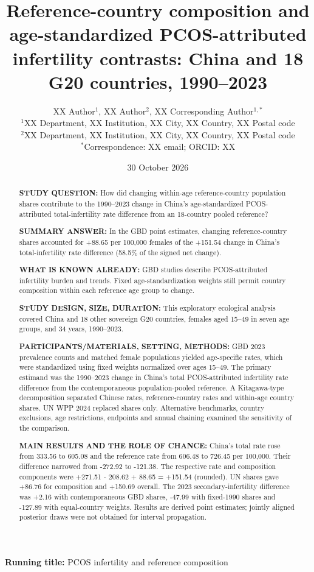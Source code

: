 \documentclass[11pt,a4paper]{article}
\title{Reference-country composition and age-standardized PCOS-attributed infertility contrasts: China and 18 G20 countries, 1990--2023}
\author{XX Author$^{1}$, XX Author$^{2}$, XX Corresponding Author$^{1,*}$\\
{\small $^{1}$XX Department, XX Institution, XX City, XX Country, XX Postal code}\\
{\small $^{2}$XX Department, XX Institution, XX City, XX Country, XX Postal code}\\
{\small $^{*}$Correspondence: XX email; ORCID: XX}}
\date{30 October 2026}
\begin{document}
\maketitle\thispagestyle{fancy}
\noindent\textbf{Running title:} PCOS infertility and reference composition

\linenumbers
\begingroup\sloppy
\begin{abstract}
\noindent\textbf{STUDY QUESTION:} {\color{blue} How did changing within-age reference-country population shares contribute to the 1990--2023 change in China's age-standardized PCOS-attributed total-infertility rate difference from an 18-country pooled reference?}

\noindent\textbf{SUMMARY ANSWER:} In the GBD point estimates, changing reference-country shares accounted for +88.65 per 100,000 females of the +151.54 change in China's total-infertility rate difference (58.5\% of the signed net change).

\noindent\textbf{WHAT IS KNOWN ALREADY:} GBD studies describe PCOS-attributed infertility burden and trends. Fixed age-standardization weights still permit country composition within each reference age group to change.

\noindent\textbf{STUDY DESIGN, SIZE, DURATION:} This exploratory ecological analysis covered China and 18 other sovereign G20 countries, females aged 15--49 in seven age groups, and 34 years, 1990--2023.

\noindent\textbf{PARTICIPANTS/MATERIALS, SETTING, METHODS:} GBD 2023 prevalence counts and matched female populations yielded age-specific rates, which were standardized using fixed weights normalized over ages 15--49. The primary estimand was the 1990--2023 change in China's total PCOS-attributed infertility rate difference from the contemporaneous population-pooled reference. A Kitagawa-type decomposition separated Chinese rates, reference-country rates and within-age country shares. UN WPP 2024 replaced shares only. Alternative benchmarks, country exclusions, age restrictions, endpoints and annual chaining examined the sensitivity of the comparison.

\noindent\textbf{MAIN RESULTS AND THE ROLE OF CHANCE:} China's total rate rose from 333.56 to 605.08 and the reference rate from 606.48 to 726.45 per 100,000. Their difference narrowed from -272.92 to -121.38. The respective rate and composition components were +271.51 - 208.62 + 88.65 = +151.54 (rounded). UN shares gave +86.76 for composition and +150.69 overall. The 2023 secondary-infertility difference was +2.16 with contemporaneous GBD shares, -47.99 with fixed-1990 shares and -127.89 with equal-country weights. Results are derived point estimates; jointly aligned posterior draws were not obtained for interval propagation.


\end{abstract}
\end{document}
